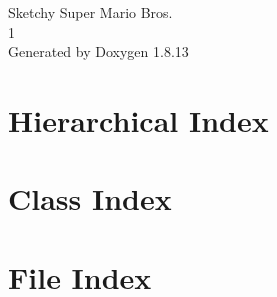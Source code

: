 \documentclass[twoside]{book}
\newcommand{\+}{\discretionary{\mbox{\scriptsize$\hookleftarrow$}}{}{}}
\newcommand{\clearemptydoublepage}{%
  \newpage{\pagestyle{empty}\cleardoublepage}%
}
\begin{document}
\hypersetup{pageanchor=false,
             bookmarksnumbered=true,
             pdfencoding=unicode
            }
\begin{titlepage}
\vspace*{7cm}
\begin{center}%
{\Large Sketchy Super Mario Bros. \\[1ex]\large 1 }\\
\vspace*{1cm}
{\large Generated by Doxygen 1.8.13}\\
\end{center}
\end{titlepage}
\clearemptydoublepage
{}
\tableofcontents
\clearemptydoublepage
{}
\hypersetup{pageanchor=true}

\chapter{Hierarchical Index}

\chapter{Class Index}

\chapter{File Index}

\end{document}
